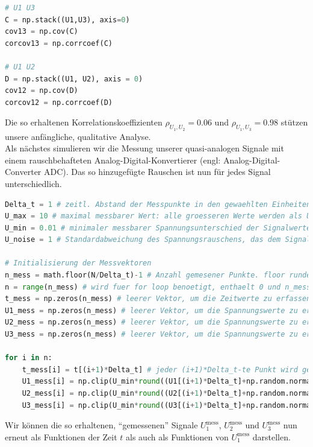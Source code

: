 \begin{lstlisting}[language = Python]
# U1 U3 
C = np.stack((U1,U3), axis=0)
cov13 = np.cov(C)
corcov13 = np.corrcoef(C)

# U1 U2
D = np.stack((U1, U2), axis = 0)
cov12 = np.cov(D)
corcov12 = np.corrcoef(D)
\end{lstlisting}

Die so erhaltenen Korrelationskoeffizienten $\rho_{U_1, U_2}=0.06$ und $\rho_{U_1, U_3}=0.98$ stützen unsere anfängliche, qualitative Analyse. \\

Als nächstes simulieren wir die Messung unserer quasi-analogen Signale mit einem rauschbehafteten Analog-Digital-Konvertierer (engl: Analog-Digital-Converter ADC). Das so hinzugefügte Rauschen ist nun für jedes Signal unterschiedlich. 
\begin{lstlisting}[language = Python]
Delta_t = 1 # zeitl. Abstand der Messpunkte in den gewaehlten Einheiten: fuer einen Zeitvektor t mit Abstaenden von je 1 Nanosekunde misst unser ADC einen Datenpunkt alle Delta_t Nanosekunden
U_max = 10 # maximal messbarer Wert: alle groesseren Werte werden als U_max angezeigt (clipping)
U_min = 0.01 # minimaler messbarer Spannungsunterschied der Signalwerte: Spannungsaufloesung des ADC
U_noise = 1 # Standardabweichung des Spannungsrauschens, das dem Signal durch den Messprozess hinzigefuegt wird

# Initialisierung der Messvektoren
n_mess = math.floor(N/Delta_t)-1 # Anzahl gemesener Punkte. floor rundet ab
n = range(n_mess) # wird fuer for loop benoetigt, enthaelt 0 und n_mess als untere und obere Grenze von n
t_mess = np.zeros(n_mess) # leerer Vektor, um die Zeitwerte zu erfassen
U1_mess = np.zeros(n_mess) # leerer Vektor, um die Spannungswerte zu erfassen
U2_mess = np.zeros(n_mess) # leerer Vektor, um die Spannungswerte zu erfassen
U3_mess = np.zeros(n_mess) # leerer Vektor, um die Spannungswerte zu erfassen

for i in n:
    t_mess[i] = t[(i+1)*Delta_t] # jeder (i+1)*Delta_t-te Punkt wird gemessen
    U1_mess[i] = np.clip(U_min*round((U1[(i+1)*Delta_t]+np.random.normal(0,U_noise))/U_min,0),-U_max,U_max) # numpy.clip limitiert die maximalen Werte auf [-U_max,U_max]
    U2_mess[i] = np.clip(U_min*round((U2[(i+1)*Delta_t]+np.random.normal(0,U_noise))/U_min,0),-U_max,U_max) # numpy.clip limitiert die maximalen Werte auf [-U_max,U_max]
    U3_mess[i] = np.clip(U_min*round((U3[(i+1)*Delta_t]+np.random.normal(0,U_noise))/U_min,0),-U_max,U_max) # numpy.clip limitiert die maximalen Werte auf [-U_max,U_max]
\end{lstlisting}
Wir können die so erhaltenen, ``gemessenen'' Signale $U_1^{\mathrm{mess}}$, $U_2^{\mathrm{mess}}$ und $U_3^{\mathrm{mess}}$ nun erneut als Funktionen der Zeit $t$ als auch als Funktionen von $U_1^{\mathrm{mess}}$ darstellen. 

